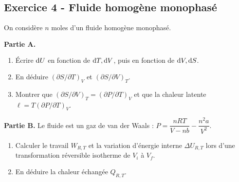 \documentclass[12pt,a4paper]{article}
\begin{document}
\subsection*{Exercice 4 - Fluide homogène monophasé \niveau{\difficile}}

\begin{boiteexercice}
On considère $n$ moles d'un fluide homogène monophasé.

\textbf{Partie A.}
\begin{enumerate}
  \item Écrire $\mathrm{d} U$ en fonction de $\mathrm{d} T, \mathrm{d} V$, puis en fonction de $\mathrm{d} V, \mathrm{d} S$.
  \item En déduire $(\partial S/\partial T)_V$ et $(\partial S/\partial V)_T$.
  \item Montrer que $(\partial S/\partial V)_T = (\partial P/\partial T)_V$ et que la chaleur latente $\ell = T(\partial P/\partial T)_V$.
\end{enumerate}

\textbf{Partie B.} Le fluide est un gaz de van der Waals : $P = \dfrac{nRT}{V-nb} - \dfrac{n^2 a}{V^2}$.
\begin{enumerate}
  \item Calculer le travail $W_{R,T}$ et la variation d'énergie interne $\Delta U_{R,T}$ lors d'une transformation réversible isotherme de $V_i$ à $V_f$.
  \item En déduire la chaleur échangée $Q_{R,T}$.
\end{enumerate}
\end{boiteexercice}
\end{document}
